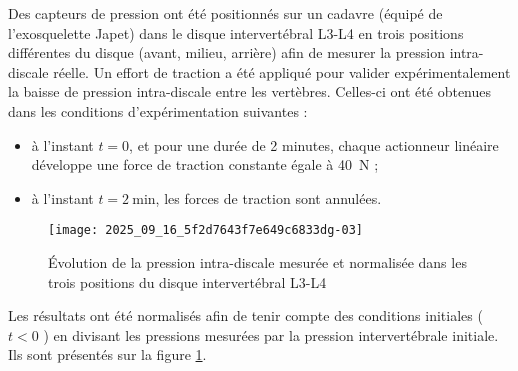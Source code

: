 Des capteurs de pression ont été positionnés sur un cadavre (équipé de l'exosquelette Japet) dans le disque intervertébral L3-L4 en trois positions différentes du disque (avant, milieu, arrière) afin de mesurer la pression intra-discale réelle. Un effort de traction a été appliqué pour valider expérimentalement la baisse de pression intra-discale entre les vertèbres. Celles-ci ont été obtenues dans les conditions d'expérimentation suivantes :

\begin{itemize}
  \item à l'instant $t=0$, et pour une durée de 2 minutes, chaque actionneur linéaire développe une force de traction constante égale à \SI{40}{N} ;
  \item à l'instant $t=2 \mathrm{~min}$, les forces de traction sont annulées.
\end{itemize}


\begin{figure}[!h]
\centering
\texttt{[image: 2025\_09\_16\_5f2d7643f7e649c6833dg-03]}
\caption{\label{ccs_mp_2023_fig_04}  Évolution de la pression intra-discale mesurée et normalisée dans les trois positions du disque intervertébral L3-L4}
\end{figure}



Les résultats ont été normalisés afin de tenir compte des conditions initiales ( $t<0$ ) en divisant les pressions mesurées par la pression intervertébrale initiale. Ils sont présentés sur la figure \ref{ccs_mp_2023_fig_04}.
\fi

